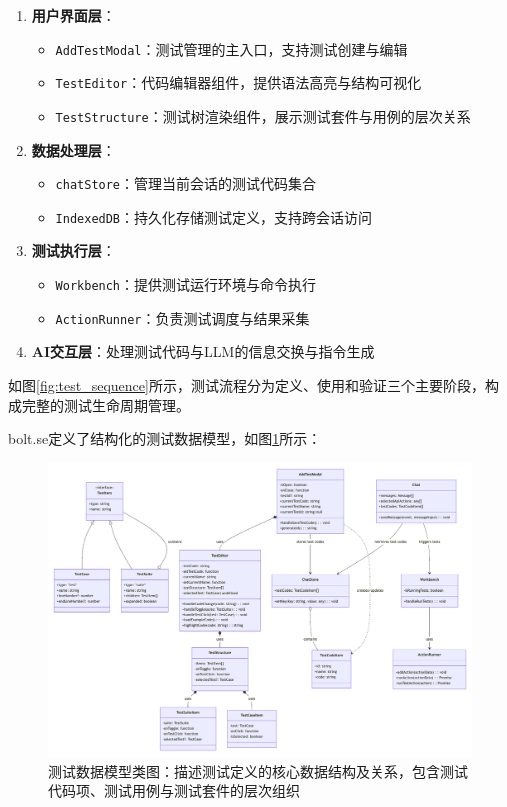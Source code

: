 \begin{enumerate}
  \item \textbf{用户界面层}：
    \begin{itemize}
      \item \texttt{AddTestModal}：测试管理的主入口，支持测试创建与编辑
      \item \texttt{TestEditor}：代码编辑器组件，提供语法高亮与结构可视化
      \item \texttt{TestStructure}：测试树渲染组件，展示测试套件与用例的层次关系
    \end{itemize}
  
  \item \textbf{数据处理层}：
    \begin{itemize}
      \item \texttt{chatStore}：管理当前会话的测试代码集合
      \item \texttt{IndexedDB}：持久化存储测试定义，支持跨会话访问
    \end{itemize}
  
  \item \textbf{测试执行层}：
    \begin{itemize}
      \item \texttt{Workbench}：提供测试运行环境与命令执行
      \item \texttt{ActionRunner}：负责测试调度与结果采集
    \end{itemize}
  
  \item \textbf{AI交互层}：处理测试代码与LLM的信息交换与指令生成
\end{enumerate}

如图\ref{fig:test_sequence}所示，测试流程分为定义、使用和验证三个主要阶段，构成完整的测试生命周期管理。

bolt.se定义了结构化的测试数据模型，如图\ref{fig:test_class}所示：

\begin{figure}[htbp]
  \centering
  \includegraphics[width=\textwidth]{figures/bolt_test_class.pdf}
  \caption{测试数据模型类图：描述测试定义的核心数据结构及关系，包含测试代码项、测试用例与测试套件的层次组织}
  \label{fig:test_class}
\end{figure}


